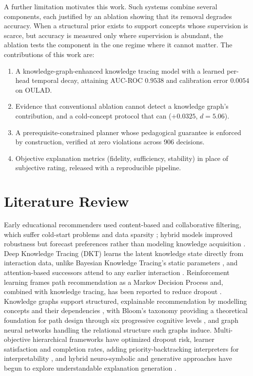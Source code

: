 \documentclass[graybox]{SNmult}
\begin{document}
A further limitation motivates this work. Such systems combine several components, each
justified by an ablation showing that its removal degrades accuracy. When a structural prior
exists to support concepts whose supervision is scarce, but accuracy is measured only where
supervision is abundant, the ablation tests the component in the one regime where it cannot
matter. The contributions of this work are:

\begin{enumerate}
\item A knowledge-graph-enhanced knowledge tracing model with a learned per-head temporal
decay, attaining AUC-ROC $0.9538$ and calibration error $0.0054$ on OULAD.
\item Evidence that conventional ablation cannot detect a knowledge graph's contribution,
and a cold-concept protocol that can ($+0.0325$, $d = 5.06$).
\item A prerequisite-constrained planner whose pedagogical guarantee is enforced by
construction, verified at zero violations across 906 decisions.
\item Objective explanation metrics (fidelity, sufficiency, stability) in place of
subjective rating, released with a reproducible pipeline.
\end{enumerate}

\section{Literature Review}
\label{sec:lit}

Early educational recommenders used content-based and collaborative filtering, which
suffer cold-start problems and data sparsity \cite{li2026survey,aher2013combination};
hybrid models improved robustness but forecast preferences rather than modeling knowledge
acquisition \cite{corbett1994knowledge}. Deep Knowledge Tracing (DKT) \cite{piech2015dkt}
learns the latent knowledge state directly from interaction data, unlike Bayesian Knowledge
Tracing's static parameters \cite{zhang2017dkvmn}, and attention-based successors
\cite{pandey2019sakt,ghosh2020akt} attend to any earlier interaction
\cite{vaswani2017attention}. Reinforcement learning frames path recommendation as a Markov
Decision Process and, combined with knowledge tracing, has been reported to reduce dropout
\cite{shen2021lpkt,zhao2026rlkt}. Knowledge graphs support structured, explainable
recommendation by modelling concepts and their dependencies
\cite{kipf2017gcn,zhang2023finegrained}, with Bloom's taxonomy providing a theoretical
foundation for path design through six progressive cognitive levels
\cite{khosravi2022xaied}, and graph neural networks handling the relational structure such
graphs induce. Multi-objective hierarchical frameworks have optimized dropout risk, learner
satisfaction and completion rates, adding priority-backtracking interpreters for
interpretability \cite{lundberg2017shap,ribeiro2016lime}, and hybrid neuro-symbolic and
generative approaches have begun to explore understandable explanation generation
\cite{yang2025explainable}.
\end{document}
